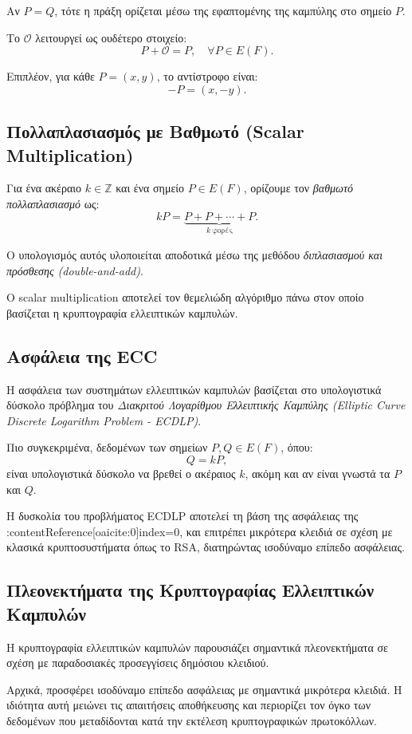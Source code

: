 \documentclass[12pt,a4paper]{report}
\begin{document}
Αν $P = Q$, τότε η πράξη ορίζεται μέσω της εφαπτομένης της καμπύλης στο σημείο $P$.

Το $\mathcal{O}$ λειτουργεί ως ουδέτερο στοιχείο:
\[
P + \mathcal{O} = P, \quad \forall P \in E(F).
\]

Επιπλέον, για κάθε $P = (x,y)$, το αντίστροφο είναι:
\[
-P = (x, -y).
\]

\subsection{Πολλαπλασιασμός με Βαθμωτό (Scalar Multiplication)}

Για ένα ακέραιο $k \in \mathbb{Z}$ και ένα σημείο $P \in E(F)$, ορίζουμε τον \textit{βαθμωτό πολλαπλασιασμό} ως:
\[
kP = \underbrace{P + P + \cdots + P}_{k \ \text{φορές}}.
\]

Ο υπολογισμός αυτός υλοποιείται αποδοτικά μέσω της μεθόδου \textit{διπλασιασμού και πρόσθεσης (double-and-add)}.

Ο scalar multiplication αποτελεί τον θεμελιώδη αλγόριθμο πάνω στον οποίο βασίζεται η κρυπτογραφία ελλειπτικών καμπυλών.

\subsection{Ασφάλεια της ECC}

Η ασφάλεια των συστημάτων ελλειπτικών καμπυλών βασίζεται στο υπολογιστικά δύσκολο πρόβλημα του \textit{Διακριτού Λογαρίθμου Ελλειπτικής Καμπύλης (Elliptic Curve Discrete Logarithm Problem - ECDLP)}.

Πιο συγκεκριμένα, δεδομένων των σημείων $P, Q \in E(F)$, όπου:
\[
Q = kP,
\]
είναι υπολογιστικά δύσκολο να βρεθεί ο ακέραιος $k$, ακόμη και αν είναι γνωστά τα $P$ και $Q$.

Η δυσκολία του προβλήματος ECDLP αποτελεί τη βάση της ασφάλειας της :contentReference[oaicite:0]{index=0}, και επιτρέπει μικρότερα κλειδιά σε σχέση με κλασικά κρυπτοσυστήματα όπως το RSA, διατηρώντας ισοδύναμο επίπεδο ασφάλειας.
\subsection{Πλεονεκτήματα της Κρυπτογραφίας Ελλειπτικών Καμπυλών}

Η κρυπτογραφία ελλειπτικών καμπυλών παρουσιάζει σημαντικά πλεονεκτήματα σε
σχέση με παραδοσιακές προσεγγίσεις δημόσιου κλειδιού.

Αρχικά, προσφέρει ισοδύναμο επίπεδο ασφάλειας με σημαντικά μικρότερα κλειδιά.
Η ιδιότητα αυτή μειώνει τις απαιτήσεις αποθήκευσης και περιορίζει τον όγκο των
δεδομένων που μεταδίδονται κατά την εκτέλεση κρυπτογραφικών πρωτοκόλλων.
\end{document}
